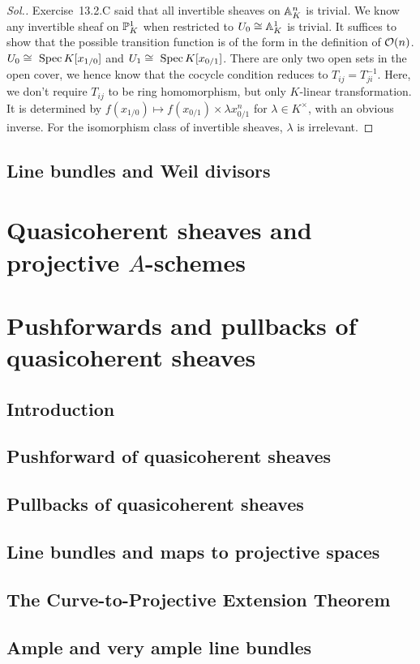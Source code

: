\documentclass[11pt]{book} %
\begin{document}
\begin{proof}[Sol.]
Exercise~13.2.C said that all invertible sheaves on $\mathbb A^n_K$ is trivial. We know any invertible sheaf on $\mathbb P^1_K$ when restricted to $U_0\cong \mathbb A^1_K$ is trivial. It suffices to show that the possible transition function is of the form in the definition of ${\cal O}(n)$.
$U_0\cong \text{ Spec\,} K[x_{1/0}]$ and $U_1\cong\text{ Spec\,} K[x_{0/1}]$. There are only two open sets in the open cover, we hence know that the cocycle condition reduces to
$T_{ij}=T_{ji}^{-1}$. Here, we don't require $T_{ij}$ to be ring homomorphism, but only $K$-linear  transformation. It is determined by $f(x_{1/0})\mapsto f(x_{0/1})\times \lambda x_{0/1}^n$ for $\lambda \in K^\times$, with an obvious inverse. For the isomorphism class of invertible sheaves, $\lambda$ is irrelevant.
\end{proof}
\section{Line bundles and Weil divisors}

\chapter{Quasicoherent sheaves and projective $A$-schemes}
\chapter{Pushforwards and pullbacks of quasicoherent sheaves}
\section{Introduction}
\section{Pushforward of quasicoherent sheaves}
\section{Pullbacks of quasicoherent sheaves}
\section{Line bundles and maps to projective spaces}
\section{The Curve-to-Projective Extension Theorem
}
\section{Ample and very ample line bundles}
\end{document}
